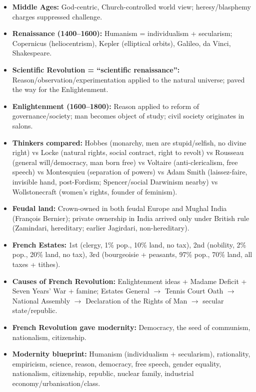 \begin{QuickRevision}
\begin{itemize}
    \item \textbf{Middle Ages:} God-centric, Church-controlled world view; heresy/blasphemy charges suppressed challenge.
    \item \textbf{Renaissance (1400--1600):} Humanism = individualism + secularism; Copernicus (heliocentrism), Kepler (elliptical orbits), Galileo, da Vinci, Shakespeare.
    \item \textbf{Scientific Revolution = ``scientific renaissance'':} Reason/observation/experimentation applied to the natural universe; paved the way for the Enlightenment.
    \item \textbf{Enlightenment (1600--1800):} Reason applied to reform of governance/society; man becomes object of study; civil society originates in salons.
    \item \textbf{Thinkers compared:} Hobbes (monarchy, men are stupid/selfish, no divine right) vs Locke (natural rights, social contract, right to revolt) vs Rousseau (general will/democracy, man born free) vs Voltaire (anti-clericalism, free speech) vs Montesquieu (separation of powers) vs Adam Smith (laissez-faire, invisible hand, post-Fordism; Spencer/social Darwinism nearby) vs Wollstonecraft (women's rights, founder of feminism).
    \item \textbf{Feudal land:} Crown-owned in both feudal Europe and Mughal India (François Bernier); private ownership in India arrived only under British rule (Zamindari, hereditary; earlier Jagirdari, non-hereditary).
    \item \textbf{French Estates:} 1st (clergy, 1\% pop., 10\% land, no tax), 2nd (nobility, 2\% pop., 20\% land, no tax), 3rd (bourgeoisie + peasants, 97\% pop., 70\% land, all taxes + tithes).
    \item \textbf{Causes of French Revolution:} Enlightenment ideas + Madame Deficit + Seven Years' War + famine; Estates General $\rightarrow$ Tennis Court Oath $\rightarrow$ National Assembly $\rightarrow$ Declaration of the Rights of Man $\rightarrow$ secular state/republic.
    \item \textbf{French Revolution gave modernity:} Democracy, the seed of communism, nationalism, citizenship.
    \item \textbf{Modernity blueprint:} Humanism (individualism + secularism), rationality, empiricism, science, reason, democracy, free speech, gender equality, nationalism, citizenship, republic, nuclear family, industrial economy/urbanisation/class.

\end{itemize}
\end{QuickRevision}
